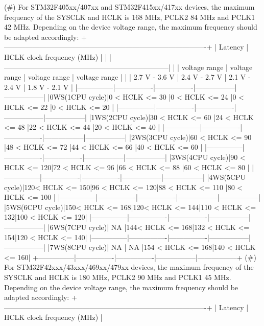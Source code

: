 \begin{DoxyVerb}
      (#) For STM32F405xx/407xx and STM32F415xx/417xx devices, the maximum frequency 
         of the SYSCLK and HCLK is 168 MHz, PCLK2 84 MHz and PCLK1 42 MHz. Depending 
         on the device voltage range, the maximum frequency should be adapted accordingly:
 +-------------------------------------------------------------------------------------+
 | Latency       |                HCLK clock frequency (MHz)                           |
 |               |---------------------------------------------------------------------|
 |               | voltage range  | voltage range  | voltage range   | voltage range   |
 |               | 2.7 V - 3.6 V  | 2.4 V - 2.7 V  | 2.1 V - 2.4 V   | 1.8 V - 2.1 V   |
 |---------------|----------------|----------------|-----------------|-----------------|
 |0WS(1CPU cycle)|0 < HCLK <= 30  |0 < HCLK <= 24  |0 < HCLK <= 22   |0 < HCLK <= 20   |
 |---------------|----------------|----------------|-----------------|-----------------|
 |1WS(2CPU cycle)|30 < HCLK <= 60 |24 < HCLK <= 48 |22 < HCLK <= 44  |20 < HCLK <= 40  |
 |---------------|----------------|----------------|-----------------|-----------------|
 |2WS(3CPU cycle)|60 < HCLK <= 90 |48 < HCLK <= 72 |44 < HCLK <= 66  |40 < HCLK <= 60  |
 |---------------|----------------|----------------|-----------------|-----------------|
 |3WS(4CPU cycle)|90 < HCLK <= 120|72 < HCLK <= 96 |66 < HCLK <= 88  |60 < HCLK <= 80  |
 |---------------|----------------|----------------|-----------------|-----------------|
 |4WS(5CPU cycle)|120< HCLK <= 150|96 < HCLK <= 120|88 < HCLK <= 110 |80 < HCLK <= 100 |
 |---------------|----------------|----------------|-----------------|-----------------|
 |5WS(6CPU cycle)|150< HCLK <= 168|120< HCLK <= 144|110 < HCLK <= 132|100 < HCLK <= 120|
 |---------------|----------------|----------------|-----------------|-----------------|
 |6WS(7CPU cycle)|      NA        |144< HCLK <= 168|132 < HCLK <= 154|120 < HCLK <= 140|
 |---------------|----------------|----------------|-----------------|-----------------|
 |7WS(8CPU cycle)|      NA        |      NA        |154 < HCLK <= 168|140 < HCLK <= 160|
 +---------------|----------------|----------------|-----------------|-----------------+
      (#) For STM32F42xxx/43xxx/469xx/479xx devices, the maximum frequency of the SYSCLK and HCLK is 180 MHz, 
          PCLK2 90 MHz and PCLK1 45 MHz. Depending on the device voltage range, the maximum 
          frequency should be adapted accordingly:
 +-------------------------------------------------------------------------------------+
 | Latency       |                HCLK clock frequency (MHz)                           |

\end{DoxyVerb}
